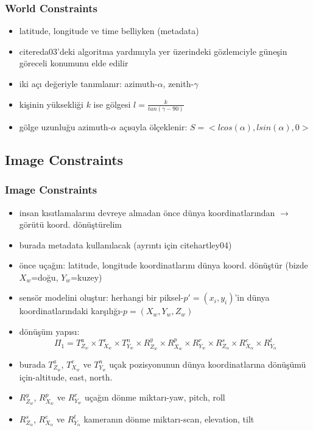 \documentclass{beamer}
\begin{document}
\begin{frame}
	\frametitle{World Constraints}

	\begin{itemize}
		\item latitude, longitude ve time belliyken (metadata)
		\item cite{reda03}'deki algoritma yardımıyla yer üzerindeki gözlemciyle
			güneşin göreceli konumunu elde edilir
		\item iki açı değeriyle tanımlanır: azimuth-$\alpha$, zenith-$\gamma$
		\item kişinin yüksekliği $k$ ise gölgesi $l = \frac{k}{tan(\gamma - 90)}$
		\item \label{eq:golge-olcekli}gölge uzunluğu azimuth-$\alpha$ açısıyla ölçeklenir:
			$S = <l	cos(\alpha), l sin(\alpha), 0>$
	\end{itemize}
\end{frame}

\subsection{Image Constraints}

\begin{frame}[allowframebreaks]

	\frametitle{Image Constraints}

	\begin{itemize}
		\item insan kısıtlamalarını devreye almadan önce dünya
			koordinatlarından $\rightarrow$ görütü koord. dönüştürelim
		\item burada metadata kullanılacak (ayrıntı için cite{hartley04})
		\item önce uçağın: latitude, longitude koordinatlarını dünya koord.
			dönüştür (bizde $X_w$=doğu, $Y_w$=kuzey)
		\item sensör modelini oluştur: herhangi bir piksel-$p'=(x_i, y_i)$'in
			dünya koordinatlarındaki karşılığı-$p=(X_w, Y_w, Z_w)$
		\item dönüşüm yapısı:
			\begin{equation}
				\Pi_1 = T^a_{Z_w} \times T^e_{X_w} \times T^n_{Y_w} \times
					R^y_{Z_w} \times R^p_{X_w} \times R^r_{Y_w} \times
					R^s_{Z_\alpha} \times R^e_{X_\alpha} \times R^t_{Y_\alpha}
					\label{eq:sensor-matrisi}
			\end{equation}
		\item burada $T^a_{Z_w}$, $T^e_{X_w}$ ve $T^n_{Y_w}$ uçak pozisyonunun
			dünya koordinatlarına dönüşümü için-altitude, east, north.
		\item $R^y_{Z_w}$, $R^p_{X_w}$ ve $R^r_{Y_w}$ uçağın dönme miktarı-yaw,
			pitch, roll
		\item $R^s_{Z_\alpha}$, $R^e_{X_\alpha}$ ve $R^t_{Y_\alpha}$ kameranın
			dönme miktarı-scan, elevation, tilt
	\end{itemize}
\end{frame}
\end{document}

